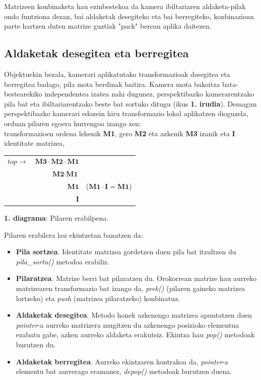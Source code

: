 \documentclass[12pt]{article}
\newcommand{\metodo}[1] {\textit{#1}}
\begin{document}
Matrizeen konbinaketa hau ezinbestekoa da kamera ibiltariaren aldaketa-pilak ondo funtziona dezan, bai aldaketak desegiteko eta bai berregiteko, konbinazioan parte hartzen duten matrize guztiak "pack" berean aplika daitezen.


\subsection{Aldaketak desegitea eta berregitea}\label{aldaketak}

Objektuekin bezala, kamerari aplikatutako transformazioak desegitea eta berregitea badago, pila mota berdinak baitira. Kamera mota bakoitza bata-bestearekiko independentea izatea nahi dugunez, perspektibazko kamerarentzako pila bat eta ibiltariarentzako beste bat sortuko ditugu (ikus \textbf{1. irudia}). Demagun perspektibazko kamerari edozein hiru transformazio lokal aplikatzen dioguzela, orduan pilaren egoera hurrengoa izango zen:\\
transformazioen ordena lehenik \textbf{M1}, gero \textbf{M2} eta azkenik \textbf{M3} izanik eta \textbf{I} identitate matrizea,

\begin{center}
\begin{tabular}{r|r|r}
 \cline{2-2}
 $top \rightarrow$ & $\textbf{M3} \cdot \textbf{M2} \cdot \textbf{M1}$ & \\
 \cline{2-2}
 & $\textbf{M2} \cdot \textbf{M1}$ & \\
 \cline{2-2}
 & $\textbf{M1}$ & \hspace{0.5cm} ($\textbf{M1} \cdot \textbf{I} = \textbf{M1}$) \\
 \cline{2-2}
 & $\textbf{I}$ & \\
 \cline{2-2}
\end{tabular}

\textbf{1. diagrama}: Pilaren erabilpena.
\end{center}

Pilaren erabilera lau ekintzetan banatzen da:

\begin{itemize}
\item \textbf{Pila sortzea}. Identitate matrizea gordetzen duen pila bat itzultzen du \metodo{pila\_sortu()} metodoa erabiliz.

\item \textbf{Pilaratzea}. Matrize berri bat pilaratzen du. Orokorrean matrize hau aurreko matrizearen transformazio bat izango da, \metodo{peek()} (pilaren gaineko matrizea lortzeko) eta \metodo{push} (matrizea pilaratzeko) konbinatuz.

\item \textbf{Aldaketak desegitea}. Metodo honek azkenengo matrizea apuntatzen duen \textit{pointer}-a\cite{pointer} aurreko matrizera mugitzen du azkenengo posizioko elementua ezabatu gabe, azken aurreko aldaketa erakutsiz. Ekintza hau \metodo{pop()} metodoak burutzen du.

\item \textbf{Aldaketak berregitea}. Aurreko ekintzaren kontrakoa da, \textit{pointer}-a elementu bat aurrerago eramanez, \metodo{depop()} metodoak burutzen duena. 
\end{itemize}
\end{document}
